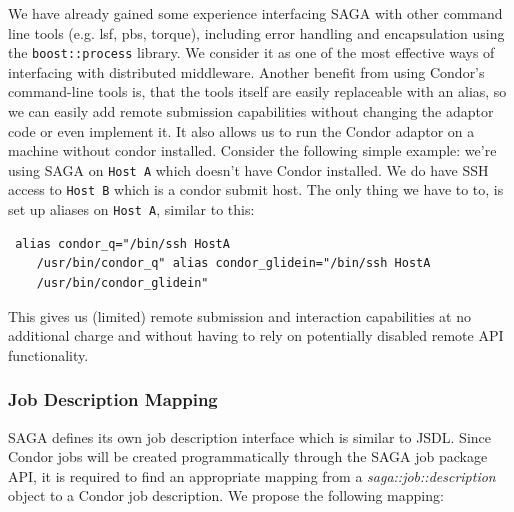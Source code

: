     We have already gained some experience interfacing SAGA with other
    command line tools (e.g. lsf, pbs, torque), including error handling
    and encapsulation using the \texttt{boost::process} library. We
    consider it as one of the most effective ways of interfacing with
    distributed middleware. Another benefit from using Condor's
    command-line tools is, that the tools itself are easily replaceable
    with an alias, so we can easily add remote submission capabilities
    without changing the adaptor code or even implement it. It also
    allows us to run the Condor adaptor on a machine without condor
    installed. Consider the following simple example: we're using SAGA
    on \texttt{Host A} which doesn't have Condor installed. We do have
    SSH access to \texttt{Host B} which is a condor submit host. The
    only thing we have to to, is set up aliases on \texttt{Host A},
    similar to this: \begin{verbatim} alias condor_q="/bin/ssh HostA
    /usr/bin/condor_q" alias condor_glidein="/bin/ssh HostA
    /usr/bin/condor_glidein" \end{verbatim}

    This gives us (limited) remote submission and interaction
    capabilities at no additional charge and without having to rely on
    potentially disabled remote API functionality.

\subsubsection{Job Description Mapping}

    SAGA defines its own job description interface which is similar to
    JSDL. Since Condor jobs will be created programmatically through the
    SAGA job package API, it is required to find an appropriate mapping
    from a \textit{saga::job::description} object to a Condor job
    description. We propose the following mapping: 
    
